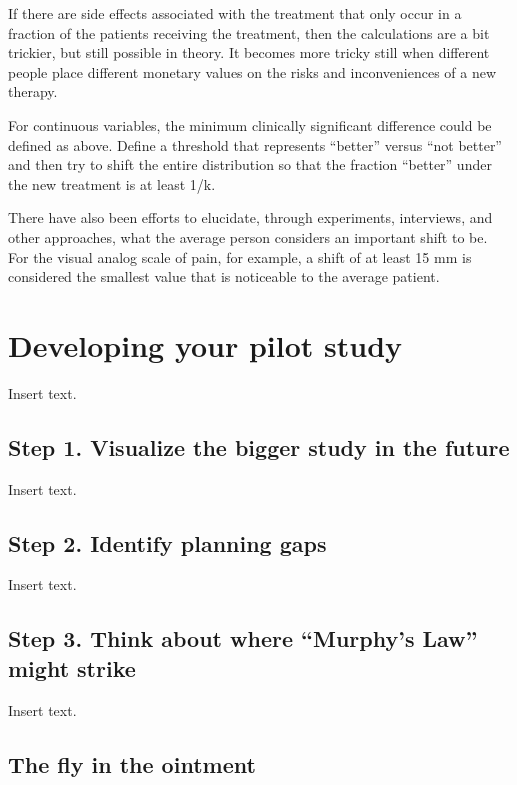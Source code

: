 \documentclass[
  letterpaper,
  DIV=11,
  numbers=noendperiod]{scrreprt}
\begin{document}
If there are side effects associated with the treatment that only occur
in a fraction of the patients receiving the treatment, then the
calculations are a bit trickier, but still possible in theory. It
becomes more tricky still when different people place different monetary
values on the risks and inconveniences of a new therapy.

For continuous variables, the minimum clinically significant difference
could be defined as above. Define a threshold that represents ``better''
versus ``not better'' and then try to shift the entire distribution so
that the fraction ``better'' under the new treatment is at least 1/k.

There have also been efforts to elucidate, through experiments,
interviews, and other approaches, what the average person considers an
important shift to be. For the visual analog scale of pain, for example,
a shift of at least 15 mm is considered the smallest value that is
noticeable to the average patient.


\chapter{Developing your pilot study}\label{developing-your-pilot-study}

Insert text.

\section{Step 1. Visualize the bigger study in the
future}\label{step-1.-visualize-the-bigger-study-in-the-future}

Insert text.

\section{Step 2. Identify planning
gaps}\label{step-2.-identify-planning-gaps}

Insert text.

\section{Step 3. Think about where ``Murphy's Law'' might
strike}\label{step-3.-think-about-where-murphys-law-might-strike}

Insert text.

\section{The fly in the ointment}\label{the-fly-in-the-ointment-3}
\end{document}
